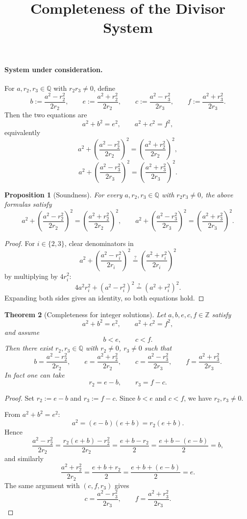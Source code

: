 \documentclass[11pt]{article}
\newtheorem{theorem}{Theorem}
\newtheorem{proposition}[theorem]{Proposition}
\begin{document}
\title{Completeness of the Divisor System}
\author{}
\date{}
\maketitle

\paragraph{System under consideration.}
For $a,r_2,r_3 \in \mathbb{Q}$ with $r_2r_3\neq 0$, define
\[
b:=\frac{a^2-r_2^2}{2r_2},\qquad
e:=\frac{a^2+r_2^2}{2r_2},\qquad
c:=\frac{a^2-r_3^2}{2r_3},\qquad
f:=\frac{a^2+r_3^2}{2r_3}.
\]
Then the two equations are
\[
a^2+b^2=e^2,\qquad a^2+c^2=f^2,
\]
equivalently
\[
a^2+\left(\frac{a^2-r_2^2}{2r_2}\right)^2
=
\left(\frac{a^2+r_2^2}{2r_2}\right)^2,
\]
\[
a^2+\left(\frac{a^2-r_3^2}{2r_3}\right)^2
=
\left(\frac{a^2+r_3^2}{2r_3}\right)^2.
\]

\begin{proposition}[Soundness]
For every $a,r_2,r_3\in\mathbb{Q}$ with $r_2r_3\neq 0$, the above formulas satisfy
\[
a^2+\left(\frac{a^2-r_2^2}{2r_2}\right)^2
=
\left(\frac{a^2+r_2^2}{2r_2}\right)^2,\qquad
a^2+\left(\frac{a^2-r_3^2}{2r_3}\right)^2
=
\left(\frac{a^2+r_3^2}{2r_3}\right)^2.
\]
\end{proposition}

\begin{proof}
For $i\in\{2,3\}$, clear denominators in
\[
a^2+\left(\frac{a^2-r_i^2}{2r_i}\right)^2
\stackrel{?}{=}
\left(\frac{a^2+r_i^2}{2r_i}\right)^2
\]
by multiplying by $4r_i^2$:
\[
4a^2r_i^2+(a^2-r_i^2)^2
\stackrel{?}{=}
(a^2+r_i^2)^2.
\]
Expanding both sides gives an identity, so both equations hold.
\end{proof}

\begin{theorem}[Completeness for integer solutions]
Let $a,b,e,c,f\in\mathbb{Z}$ satisfy
\[
a^2+b^2=e^2,\qquad a^2+c^2=f^2,
\]
and assume
\[
b<e,\qquad c<f.
\]
Then there exist $r_2,r_3\in\mathbb{Q}$ with $r_2\neq 0$, $r_3\neq 0$ such that
\[
b=\frac{a^2-r_2^2}{2r_2},\qquad
e=\frac{a^2+r_2^2}{2r_2},\qquad
c=\frac{a^2-r_3^2}{2r_3},\qquad
f=\frac{a^2+r_3^2}{2r_3}.
\]
In fact one can take
\[
r_2=e-b,\qquad r_3=f-c.
\]
\end{theorem}

\begin{proof}
Set $r_2:=e-b$ and $r_3:=f-c$. Since $b<e$ and $c<f$, we have $r_2,r_3\neq 0$.

From $a^2+b^2=e^2$:
\[
a^2=(e-b)(e+b)=r_2(e+b).
\]
Hence
\[
\frac{a^2-r_2^2}{2r_2}
=\frac{r_2(e+b)-r_2^2}{2r_2}
=\frac{e+b-r_2}{2}
=\frac{e+b-(e-b)}{2}
=b,
\]
and similarly
\[
\frac{a^2+r_2^2}{2r_2}
=\frac{e+b+r_2}{2}
=\frac{e+b+(e-b)}{2}
=e.
\]
The same argument with $(c,f,r_3)$ gives
\[
c=\frac{a^2-r_3^2}{2r_3},\qquad
f=\frac{a^2+r_3^2}{2r_3}.
\]
\end{proof}
\end{document}
